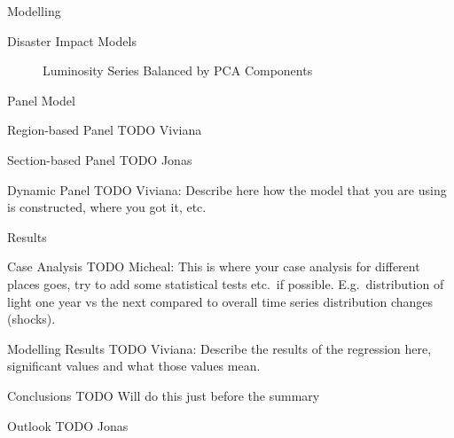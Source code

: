 \documentclass[12pt,fleqn,leqno,letterpaper]{article}
\begin{document}
\begin{section}{Modelling}
\begin{subsection}{Disaster Impact Models}
\begin{figure}[t!]
      \caption{Luminosity Series Balanced by PCA Components}
    \end{figure}
  \end{subsection}
  \begin{subsection}{Panel Model}
    \begin{subsubsection}{Region-based Panel}
      TODO Viviana
    \end{subsubsection}
    \begin{subsubsection}{Section-based Panel}
      TODO Jonas
    \end{subsubsection}
    \begin{subsubsection}{Dynamic Panel}
      TODO Viviana: Describe here how the model that you are using is constructed, where you got it, etc.
    \end{subsubsection}
  \end{subsection}
\end{section}

\begin{section}{Results}
  \begin{subsection}{Case Analysis}
    TODO Micheal: This is where your case analysis for different places goes, try to add some statistical tests etc.\ if possible. E.g.\ distribution of light one year vs the next compared to overall time series distribution changes (shocks).
  \end{subsection}
  \begin{subsection}{Modelling Results}
    TODO Viviana: Describe the results of the regression here, significant values and what those values mean.
  \end{subsection}
  \begin{subsection}{Conclusions}
    TODO Will do this just before the summary
  \end{subsection}
  \begin{subsection}{Outlook}
    TODO Jonas
  \end{subsection}
\end{section}


\end{document}
